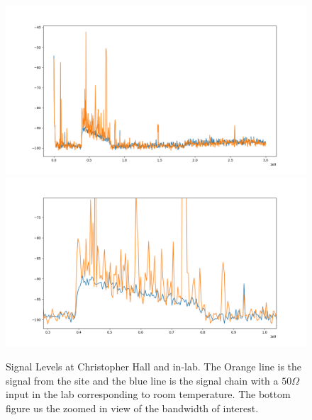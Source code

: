 \documentclass[11pt,letterpaper]{article}
\begin{document}
\begin{figure}
\centering
	\includegraphics[width = \textwidth]{Figure_1-1}
	\includegraphics[width = \textwidth]{Figure_1-2}
	\caption{Signal Levels at Christopher Hall and in-lab. The Orange line is the signal from the site and the blue line is the signal chain with a $50 \Omega$ input in the lab corresponding to room temperature. The bottom figure us the zoomed in view of the bandwidth of interest.} \label{fig:signallevels}

\end{figure}
\end{document}
